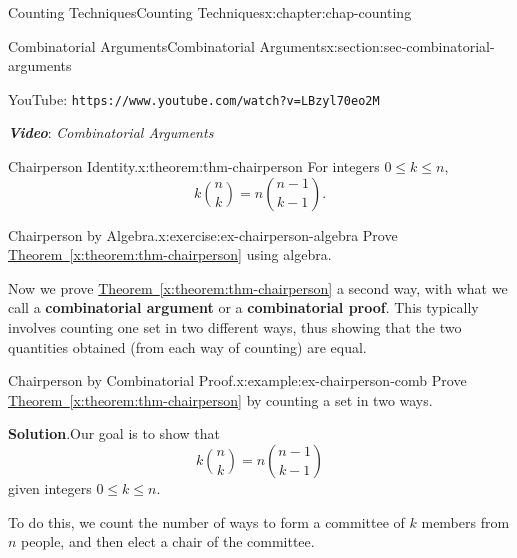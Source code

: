 \documentclass[oneside,10pt,]{book}
\newcommand{\blocktitlefont}{\relax}
\newcommand{\xreffont}{\relax}
\newcommand{\mono}[1]{\texttt{#1}}
\newcommand{\alert}[1]{\textbf{\textit{#1}}}
\newcommand{\terminology}[1]{\textbf{#1}}
\numberwithin{equation}{section}
\newlength{\qrsize}
\newlength{\previewwidth}
\begin{document}
\begin{chapterptx}{Counting Techniques}{}{Counting Techniques}{}{}{x:chapter:chap-counting}
\begin{sectionptx}{Combinatorial Arguments}{}{Combinatorial Arguments}{}{}{x:section:sec-combinatorial-arguments}
\begin{sidebyside}{1}{0}{0}{0}
\begin{sbspanel}{1}
\begin{tcbraster}[raster columns=2, raster column skip=1pt, raster halign=center, raster force size=false, raster left skip=0pt, raster right skip=0pt]
\begin{tcolorbox}[previewstyle, width=\previewwidth]
\end{tcolorbox}%
\begin{tcolorbox}[qrstyle]%
{\hypersetup{urlcolor=black}}%
\end{tcolorbox}%
\begin{tcolorbox}[captionstyle]%
\small YouTube: \mono{https://www.youtube.com/watch?v=LBzyl70eo2M}\end{tcolorbox}%
\end{tcbraster}%
\end{sbspanel}%
\end{sidebyside}%
\par
\alert{Video}: \emph{Combinatorial Arguments}%
\begin{theorem}{Chairperson Identity.}{}{x:theorem:thm-chairperson}%
For integers \(0 \leq k \leq n\),%
\begin{equation*}
k\binom{n}{k} = n\binom{n-1}{k-1}\text{.}
\end{equation*}
%
\end{theorem}
\begin{inlineexercise}{Chairperson by Algebra.}{x:exercise:ex-chairperson-algebra}%
Prove \hyperref[x:theorem:thm-chairperson]{Theorem~{\xreffont\ref{x:theorem:thm-chairperson}}} using algebra.%
\end{inlineexercise}%
Now we prove \hyperref[x:theorem:thm-chairperson]{Theorem~{\xreffont\ref{x:theorem:thm-chairperson}}} a second way, with what we call a \terminology{combinatorial argument} or a \terminology{combinatorial proof}. This typically involves counting one set in two different ways, thus showing that the two quantities obtained (from each way of counting) are equal.%
\begin{example}{Chairperson by Combinatorial Proof.}{x:example:ex-chairperson-comb}%
Prove \hyperref[x:theorem:thm-chairperson]{Theorem~{\xreffont\ref{x:theorem:thm-chairperson}}} by counting a set in two ways.%
\par\smallskip%
\noindent\textbf{\blocktitlefont Solution}.\hypertarget{g:solution:id527544}{}\quad{}Our goal is to show that%
\begin{equation}
k\binom{n}{k} = n\binom{n-1}{k-1}\label{x:men:equation-chairperson}
\end{equation}
given integers \(0 \leq k \leq n\).%
\par
To do this, we count the number of ways to form a committee of \(k\) members from \(n\) people, and then elect a chair of the committee.%
\par

\end{example}
\end{sectionptx}
\end{chapterptx}
\end{document}
